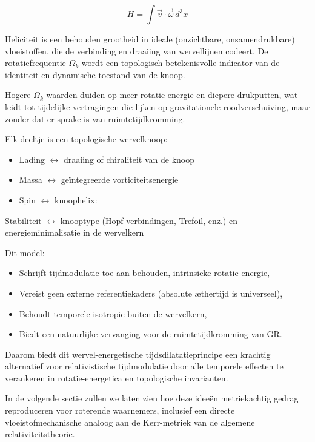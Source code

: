 \begin{equation}
H = \int \vec{v} \cdot \vec{\omega} \, d^3x \label{eq:helicity_rotation}
\end{equation}

Heliciteit is een behouden grootheid in ideale (onzichtbare, onsamendrukbare) vloeistoffen, die de verbinding en draaiing van wervellijnen codeert. De rotatiefrequentie $\Omega_k$ wordt een topologisch betekenisvolle indicator van de identiteit en dynamische toestand van de knoop.

Hogere $\Omega_k$-waarden duiden op meer rotatie-energie en diepere drukputten, wat leidt tot tijdelijke vertragingen die lijken op gravitationele roodverschuiving, maar zonder dat er sprake is van ruimtetijdkromming.

Elk deeltje is een topologische wervelknoop:
\begin{itemize}
\item Lading $\leftrightarrow$ draaiing of chiraliteit van de knoop
\item Massa $\leftrightarrow$ geïntegreerde vorticiteitsenergie
\item Spin $\leftrightarrow$ knoophelix:
\end{itemize}
Stabiliteit $\leftrightarrow$ knooptype (Hopf-verbindingen, Trefoil, enz.) en energieminimalisatie in de wervelkern

Dit model:

\begin{itemize}
\item Schrijft tijdmodulatie toe aan behouden, intrinsieke rotatie-energie,
\item Vereist geen externe referentiekaders (absolute æthertijd is universeel),
\item Behoudt temporele isotropie buiten de wervelkern,
\item Biedt een natuurlijke vervanging voor de ruimtetijdkromming van GR. \end{itemize}

Daarom biedt dit wervel-energetische tijdsdilatatieprincipe een krachtig alternatief voor relativistische tijdmodulatie door alle temporele effecten te verankeren in rotatie-energetica en topologische invarianten.

In de volgende sectie zullen we laten zien hoe deze ideeën metriekachtig gedrag reproduceren voor roterende waarnemers, inclusief een directe vloeistofmechanische analoog aan de Kerr-metriek van de algemene relativiteitstheorie.